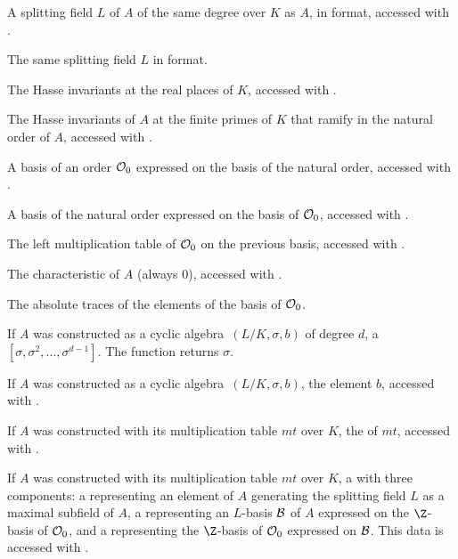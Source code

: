  \item A splitting field $L$ of $A$ of the same degree over $K$ as $A$, in
 format, accessed with .

 \item The same splitting field $L$ in  format.

 \item The Hasse invariants at the real places of $K$, accessed with
.

 \item The Hasse invariants of $A$ at the finite primes of $K$ that ramify in
the natural order of $A$, accessed with .

 \item A basis of an order ${\cal O}_0$ expressed on the basis of the natural
order, accessed with .

 \item A basis of the natural order expressed on the basis of ${\cal O}_0$,
accessed with .

 \item The left multiplication table of ${\cal O}_0$ on the previous basis,
accessed with .

 \item The characteristic of $A$ (always $0$), accessed with .

 \item The absolute traces of the elements of the basis of ${\cal O}_0$.

 \item If $A$ was constructed as a cyclic algebra~$(L/K,\sigma,b)$ of degree
$d$, a  $[\sigma,\sigma^2,\dots,\sigma^{d-1}]$. The function
 returns $\sigma$.

 \item If $A$ was constructed as a cyclic algebra~$(L/K,\sigma,b)$, the
element $b$, accessed with .

 \item If $A$ was constructed with its multiplication table $mt$ over $K$,
the  of  $mt$, accessed with .

 \item If $A$ was constructed with its multiplication table $mt$ over $K$,
a  with three components: a  representing an element of $A$
generating the splitting field $L$ as a maximal subfield of $A$, a 
representing an $L$-basis ${\cal B}$ of $A$ expressed on the $\Z$-basis of
${\cal O}_0$, and a  representing the $\Z$-basis of ${\cal O}_0$
expressed on ${\cal B}$. This data is accessed with .

